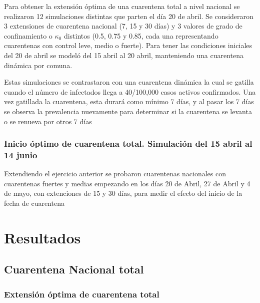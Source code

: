 \documentclass[]{article}
\begin{document}
Para obtener la extensión óptima de una cuarentena total a nivel nacional se realizaron 12 simulaciones distintas que parten el día 20 de abril. Se consideraron 3 extensiones de cuarentena nacional (7, 15 y 30 días) y 3 valores de grado de confinamiento o \(\kappa_0\) distintos (0.5, 0.75 y 0.85, cada una representando cuarentenas con control leve, medio o fuerte). Para tener las condiciones iniciales del 20 de abril se modeló del 15 abril al 20 abril, manteniendo una cuarentena dinámica por comuna.

Estas simulaciones se contrastaron con una cuarentena dinámica la cual se gatilla cuando el número de infectados llega a 40/100,000 casos activos confirmados. Una vez gatillada la cuarentena, esta durará como mínimo 7 días, y al pasar los 7 días se observa la prevalencia nuevamente para determinar si la cuarentena se levanta o se renueva por otros 7 días

\hypertarget{inicio-uxf3ptimo-de-cuarentena-total.-simulaciuxf3n-del-15-abril-al-14-junio}{%
\subsubsection{Inicio óptimo de cuarentena total. Simulación del 15 abril al 14 junio}\label{inicio-uxf3ptimo-de-cuarentena-total.-simulaciuxf3n-del-15-abril-al-14-junio}}

Extendiendo el ejercicio anterior se probaron cuarentenas nacionales con cuarentenas fuertes y medias empezando en los días 20 de Abril, 27 de Abril y 4 de mayo, con extenciones de 15 y 30 días, para medir el efecto del inicio de la fecha de cuarentena

\hypertarget{resultados}{%
\section{Resultados}\label{resultados}}

\hypertarget{cuarentena-nacional-total-1}{%
\subsection{Cuarentena Nacional total}\label{cuarentena-nacional-total-1}}

\hypertarget{extensiuxf3n-uxf3ptima-de-cuarentena-total}{%
\subsubsection{Extensión óptima de cuarentena total}\label{extensiuxf3n-uxf3ptima-de-cuarentena-total}}
\end{document}
